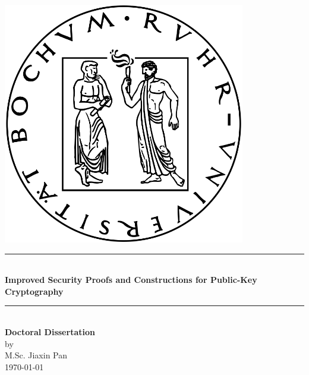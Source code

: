 \documentclass[a4paper,twoside,table,10pt,openright]{mythesis}
\title{\thesistitle}
\author{M.Sc. Jiaxin Pan}
\date{Soon}
\def\thesistitle{Improved Security Proofs and Constructions for Public-Key Cryptography}
\begin{document}
	\begin{titlepage}
		\centering
		\includegraphics[width=300pt]{Rublogo}
		\ \\[100pt]
		\rule[0pt]{\textwidth}{1pt}\\[7pt]
		{\LARGE \textbf{\thesistitle}}
		\rule[1pt]{\textwidth}{1pt}\\[140pt]
		{\LARGE \textbf{Doctoral Dissertation}}\\
		\vfill
		{\Large by}\\[5pt]
		{\Large {M.Sc. Jiaxin Pan}}\\[10pt]
		{\today}
	\end{titlepage}
%
%
%
\end{document}
